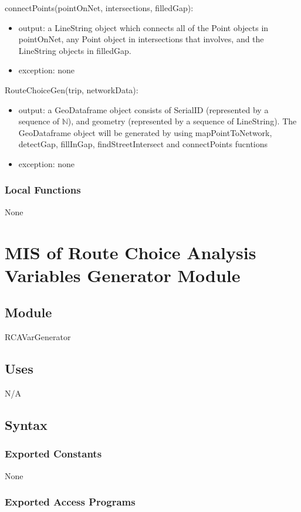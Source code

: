 \documentclass[12pt, titlepage]{article}
\begin{document}
\noindent connectPoints(pointOnNet, intersections, filledGap):
\begin{itemize}
\item output: a LineString object which connects all of the Point objects in pointOnNet, any Point object in intersections that involves, and the LineString objects in filledGap.
\item exception: none
\end{itemize}

\noindent RouteChoiceGen(trip, networkData):
\begin{itemize}
\item output: a GeoDataframe object consists of SerialID (represented by a sequence of $\mathbb{N}$), and geometry (represented by a sequence of LineString). The GeoDataframe object will be generated by using mapPointToNetwork, detectGap, fillInGap, findStreetIntersect and connectPoints fucntions
\item exception: none
\end{itemize}

\subsubsection{Local Functions}
None

\newpage

\section{MIS of Route Choice Analysis Variables Generator Module} \label{RCAVarGenerator} 

\subsection{Module}
RCAVarGenerator

\subsection{Uses}
N/A

\subsection{Syntax}

\subsubsection{Exported Constants}
None
\subsubsection{Exported Access Programs}
\end{document}

